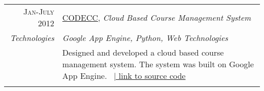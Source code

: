 \documentclass[a4paper,11pt]{article} %
\begin{document}
\begin{longtable}{r|p{15cm}}

%


\textsc{Jan-July 2012} & \href{http://www.codecc.co.nr/}{CODECC}, \emph{Cloud Based Course Management System}\\
\emph{Technologies} & \emph{Google App Engine, Python, Web Technologies}\\ 
& \small{Designed and developed a cloud based course management system. The system was built on Google App Engine. } \ \href{https://github.com/am2990/codecc}{\hfill | link to source code}\\
\multicolumn{2}{c}{} \\


\end{longtable}
\end{document}
